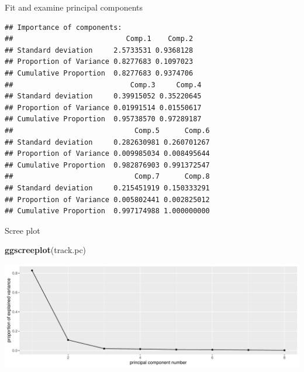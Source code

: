 \documentclass[
  ignorenonframetext,
]{beamer}
\newenvironment{Shaded}{\begin{snugshade}}{\end{snugshade}}
\newcommand{\DataTypeTok}[1]{\textcolor[rgb]{0.13,0.29,0.53}{#1}}
\newcommand{\KeywordTok}[1]{\textcolor[rgb]{0.13,0.29,0.53}{\textbf{#1}}}
\newcommand{\NormalTok}[1]{#1}
\newcommand{\OperatorTok}[1]{\textcolor[rgb]{0.81,0.36,0.00}{\textbf{#1}}}
\newcommand{\StringTok}[1]{\textcolor[rgb]{0.31,0.60,0.02}{#1}}
\begin{document}
\begin{frame}[fragile]{Fit and examine principal components}
\protect\hypertarget{fit-and-examine-principal-components}{}

\footnotesize

\begin{Shaded}
\end{Shaded}

\begin{verbatim}
## Importance of components:
##                           Comp.1    Comp.2
## Standard deviation     2.5733531 0.9368128
## Proportion of Variance 0.8277683 0.1097023
## Cumulative Proportion  0.8277683 0.9374706
##                            Comp.3     Comp.4
## Standard deviation     0.39915052 0.35220645
## Proportion of Variance 0.01991514 0.01550617
## Cumulative Proportion  0.95738570 0.97289187
##                             Comp.5      Comp.6
## Standard deviation     0.282630981 0.260701267
## Proportion of Variance 0.009985034 0.008495644
## Cumulative Proportion  0.982876903 0.991372547
##                             Comp.7      Comp.8
## Standard deviation     0.215451919 0.150333291
## Proportion of Variance 0.005802441 0.002825012
## Cumulative Proportion  0.997174988 1.000000000
\end{verbatim}

\normalsize

\end{frame}

\begin{frame}[fragile]{Scree plot}
\protect\hypertarget{scree-plot-2}{}

\begin{Shaded}
\begin{Highlighting}[]
\KeywordTok{ggscreeplot}\NormalTok{(track.pc)}
\end{Highlighting}
\end{Shaded}

\includegraphics{slides_d29_files/figure-beamer/scree-b-1.pdf}

\end{frame}
\end{document}
